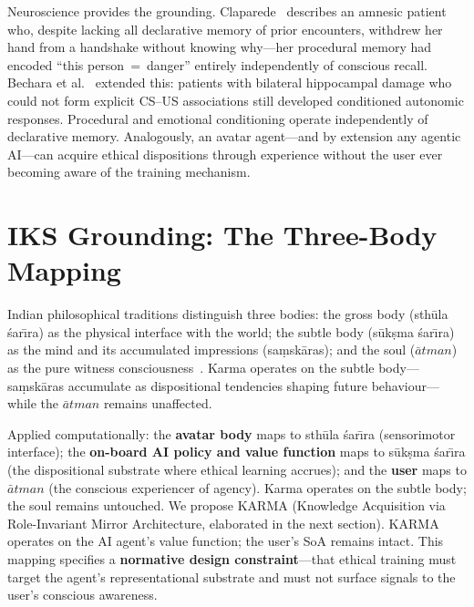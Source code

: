 \documentclass[runningheads]{llncs}
\begin{document}
Neuroscience provides the grounding. Claparede~\cite{claparede} describes an
amnesic patient who, despite lacking all declarative memory of prior encounters,
withdrew her hand from a handshake without knowing why---her procedural memory
had encoded ``this person~=~danger'' entirely independently of conscious recall.
Bechara et al.~\cite{bechara95} extended this: patients with bilateral
hippocampal damage who could not form explicit CS--US associations still
developed conditioned autonomic responses. Procedural and emotional conditioning
operate independently of declarative memory. Analogously, an avatar agent---and
by extension any agentic AI---can acquire ethical dispositions through experience
without the user ever becoming aware of the training mechanism.

\section{IKS Grounding: The Three-Body Mapping}

Indian philosophical traditions distinguish three bodies: the gross body
(sth\={u}la \'{s}ar\={\i}ra) as the physical interface with the world; the
subtle body (s\={u}k\d{s}ma \'{s}ar\={\i}ra) as the mind and its accumulated
impressions (sa\d{m}sk\={a}ras); and the soul ($\bar{a}tman$) as the pure
witness consciousness~\cite{reichenbach90,potter64,dasgupta23}. Karma operates
on the subtle body---sa\d{m}sk\={a}ras accumulate as dispositional tendencies
shaping future behaviour---while the $\bar{a}tman$ remains unaffected.

Applied computationally: the \textbf{avatar body} maps to sth\={u}la
\'{s}ar\={\i}ra (sensorimotor interface); the \textbf{on-board AI policy and
value function} maps to s\={u}k\d{s}ma \'{s}ar\={\i}ra (the dispositional
substrate where ethical learning accrues); and the \textbf{user} maps to
$\bar{a}tman$ (the conscious experiencer of agency). Karma operates on the
subtle body; the soul remains untouched. We propose KARMA (Knowledge Acquisition via Role-Invariant Mirror Architecture, elaborated in the next section). KARMA operates on the AI agent's value
function; the user's SoA remains intact. This mapping specifies a
\textbf{normative design constraint}---that ethical training must target the
agent's representational substrate and must not surface signals to the user's
conscious awareness.

\end{document}
